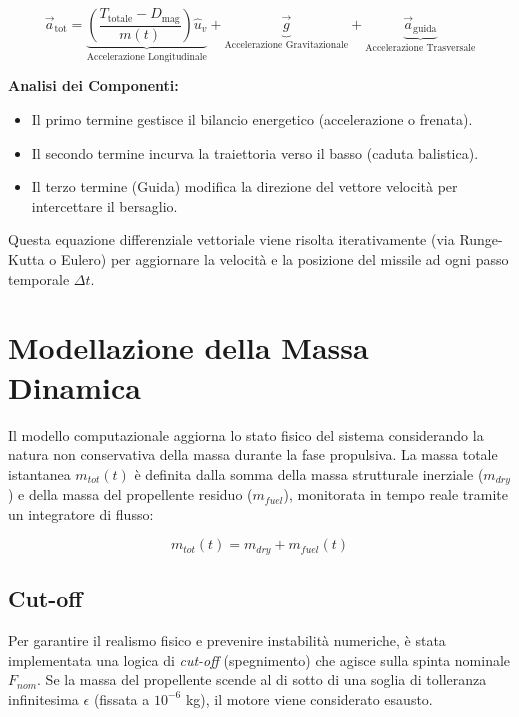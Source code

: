 \documentclass[12pt,a4paper]{article}
\begin{document}
\begin{equation}
    \vec{a}_{\text{tot}} = \underbrace{\left( \frac{T_{\text{totale}} - D_{\text{mag}}}{m(t)} \right) \hat{u}_v}_{\text{Accelerazione Longitudinale}} + \underbrace{\vec{g}}_{\text{Accelerazione Gravitazionale}} + \underbrace{\vec{a}_{\text{guida}}}_{\text{Accelerazione Trasversale}}
\end{equation}

\textbf{Analisi dei Componenti:}
\begin{itemize}
    \item Il primo termine gestisce il bilancio energetico (accelerazione o frenata).
    \item Il secondo termine incurva la traiettoria verso il basso (caduta balistica).
    \item Il terzo termine (Guida) modifica la direzione del vettore velocità per intercettare il bersaglio.
\end{itemize}

Questa equazione differenziale vettoriale viene risolta iterativamente (via Runge-Kutta o Eulero) per aggiornare la velocità e la posizione del missile ad ogni passo temporale $\Delta t$.


\section{Modellazione della Massa Dinamica}

Il modello computazionale aggiorna lo stato fisico del sistema considerando la natura non conservativa della massa durante la fase propulsiva. La massa totale istantanea $m_{tot}(t)$ è definita dalla somma della massa strutturale inerziale ($m_{dry}$) e della massa del propellente residuo ($m_{fuel}$), monitorata in tempo reale tramite un integratore di flusso:

\begin{equation}
    m_{tot}(t) = m_{dry} + m_{fuel}(t)
\end{equation}

\subsection{Cut-off}
Per garantire il realismo fisico e prevenire instabilità numeriche, è stata implementata una logica di \textit{cut-off} (spegnimento) che agisce sulla spinta nominale $F_{nom}$. Se la massa del propellente scende al di sotto di una soglia di tolleranza infinitesima $\epsilon$ (fissata a $10^{-6}$ kg), il motore viene considerato esausto. 
\end{document}

